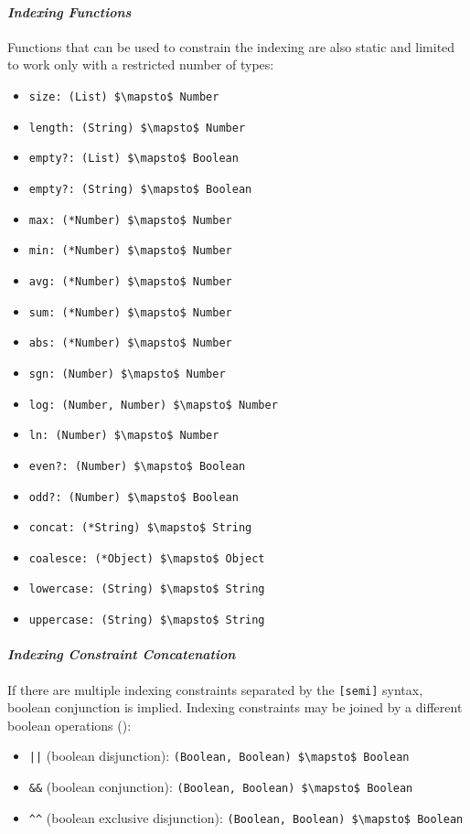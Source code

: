 \paragraph{\em Indexing Functions}
Functions that can be used to constrain the indexing are also static and limited to work only with a restricted number of types:
\begin{itemize}
\item \lstinline!size: (List) $\mapsto$ Number!
\item \lstinline!length: (String) $\mapsto$ Number!
\item \lstinline!empty?: (List) $\mapsto$ Boolean!
\item \lstinline!empty?: (String) $\mapsto$ Boolean!
\item \lstinline!max: (*Number) $\mapsto$ Number!
\item \lstinline!min: (*Number) $\mapsto$ Number!
\item \lstinline!avg: (*Number) $\mapsto$ Number!
\item \lstinline!sum: (*Number) $\mapsto$ Number!
\item \lstinline!abs: (*Number) $\mapsto$ Number!
\item \lstinline!sgn: (Number) $\mapsto$ Number!
\item \lstinline!log: (Number, Number) $\mapsto$ Number!
\item \lstinline!ln: (Number) $\mapsto$ Number!
\item \lstinline!even?: (Number) $\mapsto$ Boolean!
\item \lstinline!odd?: (Number) $\mapsto$ Boolean!
\item \lstinline!concat: (*String) $\mapsto$ String!
\item \lstinline!coalesce: (*Object) $\mapsto$ Object!
\item \lstinline!lowercase: (String) $\mapsto$ String!
\item \lstinline!uppercase: (String) $\mapsto$ String!
\end{itemize}

\paragraph{\em Indexing Constraint Concatenation}
If there are multiple indexing constraints separated by the \lstinline![semi]! syntax, boolean conjunction is implied. Indexing constraints may be joined by a different boolean operations (): 
\begin{itemize}
\item \lstinline!||! (boolean disjunction): \lstinline!(Boolean, Boolean) $\mapsto$ Boolean!
\item \lstinline!&&! (boolean conjunction): \lstinline!(Boolean, Boolean) $\mapsto$ Boolean!
\item \lstinline!^^! (boolean exclusive disjunction): \lstinline!(Boolean, Boolean) $\mapsto$ Boolean!
\end{itemize}

